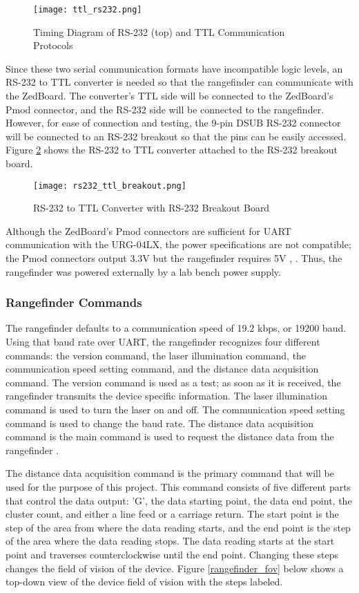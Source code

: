 \begin{figure}[H]
	\centerline{\texttt{[image: ttl\_rs232.png]}}
	\caption{Timing Diagram of RS-232 (top) and TTL Communication Protocols \cite{ttl}}
	\label{ttl_rs232_pic}
\end{figure}

Since these two serial communication formats have incompatible logic levels, an RS-232 to TTL converter is needed so that the rangefinder can communicate with the ZedBoard. The converter's TTL side will be connected to the ZedBoard's Pmod connector, and the RS-232 side will be connected to the rangefinder. However, for ease of connection and testing, the 9-pin DSUB RS-232 connector will be connected to an RS-232 breakout so that the pins can be easily accessed. Figure \ref{rs232_ttl_breakout} shows the RS-232 to TTL converter attached to the RS-232 breakout board.

\begin{figure}[H]
	\centerline{\texttt{[image: rs232\_ttl\_breakout.png]}}
	\caption{RS-232 to TTL Converter with RS-232 Breakout Board}
	\label{rs232_ttl_breakout}
\end{figure}

Although the ZedBoard's Pmod connectors are sufficient for UART communication with the URG-04LX, the power specifications are not compatible; the Pmod connectors output 3.3V but the rangefinder requires 5V \cite{zedboard_datasheet}, \cite{urg04lx_specifications}. Thus, the rangefinder was powered externally by a lab bench power supply.

\subsubsection{Rangefinder Commands}
The rangefinder defaults to a communication speed of 19.2 kbps, or 19200 baud. Using that baud rate over UART, the rangefinder recognizes four different commands: the version command, the laser illumination command, the communication speed setting command, and the distance data acquisition command. The version command is used as a test; as soon as it is received, the rangefinder transmits the device specific information. The laser illumination command is used to turn the laser on and off. The communication speed setting command is used to change the baud rate. The distance data acquisition command is the main command is used to request the distance data from the rangefinder \cite{urg04lx_datasheet}.
\par
The distance data acquisition command is the primary command that will be used for the purpose of this project. This command consists of five different parts that control the data output: 'G', the data starting point, the data end point, the cluster count, and either a line feed or a carriage return. The start point is the step of the area from where the data reading starts, and the end point is the step of the area where the data reading stops. The data reading starts at the start point and traverses counterclockwise until the end point. Changing these steps changes the field of vision of the device. Figure \ref{rangefinder_fov} below shows a top-down view of the device field of vision with the steps labeled.

